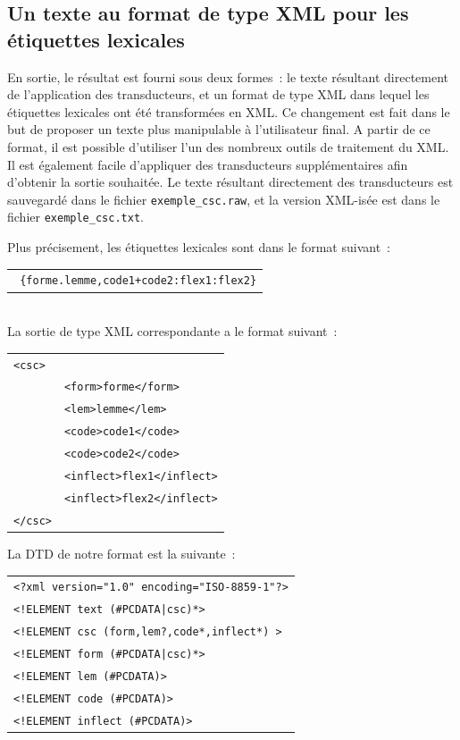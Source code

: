 \subsection{Un texte au format de type XML pour les étiquettes lexicales}

En sortie, le résultat est fourni sous deux formes~: le texte résultant directement de l'application des transducteurs, et un format de type XML dans lequel les étiquettes lexicales ont été transformées en XML.
Ce changement est fait dans le but de proposer un texte plus manipulable  à l'utilisateur final.
A partir de ce format, il est possible d'utiliser l'un des nombreux outils de traitement du XML.
Il est également facile d'appliquer des transducteurs supplémentaires afin d'obtenir la sortie souhaitée.
Le texte résultant directement des transducteurs est sauvegardé dans le fichier  \verb+exemple_csc.raw+, et la version  XML-isée est dans le fichier \verb+exemple_csc.txt+.

Plus précisement, les étiquettes lexicales sont dans le format suivant~:\\
\begin{tabular}{c}
\texttt{
\{forme.lemme,code1+code2:flex1:flex2\}}
\end{tabular}\\
La sortie de type XML correspondante a le format suivant~:\\
\begin{tabular}{ll}
\texttt{<csc>}&\\
	&\texttt{<form>forme</form>}\\
	&\texttt{<lem>lemme</lem>}\\
	&\texttt{<code>code1</code>}\\
	&\texttt{<code>code2</code>}\\
	&\texttt{<inflect>flex1</inflect>}\\
	&\texttt{<inflect>flex2</inflect>}\\
\texttt{</csc>}&\\
\end{tabular}

La DTD de notre format est la suivante~:

\begin{tabular}{l}
\texttt{<?xml version="1.0" encoding="ISO-8859-1"?>}\\
\texttt{<!ELEMENT text (\#PCDATA|csc)*>}\\
\texttt{<!ELEMENT csc (form,lem?,code*,inflect*) >}\\
\texttt{<!ELEMENT form (\#PCDATA|csc)*>}\\
\texttt{<!ELEMENT lem (\#PCDATA)>}\\
\texttt{<!ELEMENT code (\#PCDATA)>}\\
\texttt{<!ELEMENT inflect (\#PCDATA)>}\\
\end{tabular}



